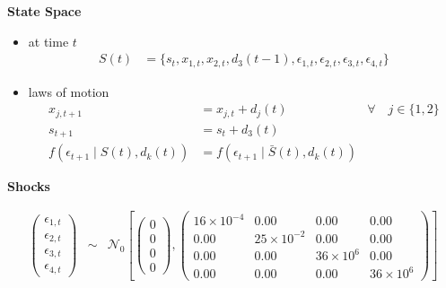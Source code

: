 \begin{frame}
\textbf{State Space}\vspace{0.3cm}
\begin{itemize}
\item at time $t$
\begin{align*}
S(t) & = \{s_t, x_{1,t}, x_{2,t}, d_3(t-1), \epsilon_{1,t}, \epsilon_{2,t}, \epsilon_{3,t}, \epsilon_{4,t}\}
\end{align*}
\item laws of motion
\begin{align*}
x_{j, t + 1} & = x_{j, t} + d_j(t) & \forall\quad j \in \{1, 2\}  \\[1em]
s_{t + 1}    & = s_t + d_3(t) &  \\[1em]
f(\epsilon_{t + 1}\mid S(t), d_k(t)) & = f(\epsilon_{t + 1}\mid \bar{S}(t), d_k(t))
\end{align*}
\end{itemize}
\end{frame}
\begin{frame}
\textbf{Shocks}\vspace{0.3cm}

\scriptsize\begin{eqnarray*}
\begin{pmatrix}
\epsilon_{1,t}\\
\epsilon_{2,t}\\
\epsilon_{3,t}\\
\epsilon_{4,t}
\end{pmatrix} & \sim & \mathcal{N}_0\left[\left(\begin{array}{c}
0\\
0\\
0\\
0
\end{array}\right),\left(\begin{array}{cccc}
16\times10^{-4}  &   0.00              &   0.00  &     0.00 \\
0.00            &   25\times10^{-2} &    0.00   &    0.00 \\
0.00            &   0.00              & 36\times10^{6}   &    0.00 \\
0.00            &   0.00              &   0.00 & 36\times10^{6}
\end{array}\right)\right]
\end{eqnarray*}

\end{frame}

